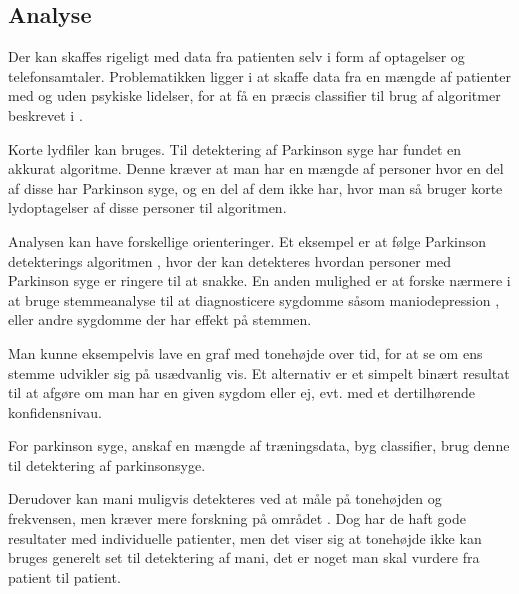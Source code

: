 \subsection{Analyse}
\begin{description}[style=nextline]
	\item[Har vi data nok?]
	Der kan skaffes rigeligt med data fra patienten selv i form af optagelser og telefonsamtaler. Problematikken ligger i at skaffe data fra en mængde af patienter med og uden psykiske lidelser, for at få en præcis classifier til brug af algoritmer beskrevet i \citep{6168572,6346375}.
	
	\item[Hvilke data skal benyttes?]
	Korte lydfiler kan bruges. Til detektering af Parkinson syge har \citep{6168572} fundet en akkurat algoritme. Denne kræver at man har en mængde af personer hvor en del af disse har Parkinson syge, og en del af dem ikke har, hvor man så bruger korte lydoptagelser af disse personer til algoritmen.
	
	\item[Formål med analysen]
	Analysen kan have forskellige orienteringer. Et eksempel er at følge Parkinson detekterings algoritmen \citep{6168572}, hvor der kan detekteres hvordan personer med Parkinson syge er ringere til at snakke.
	En anden mulighed er at forske nærmere i at bruge stemmeanalyse til at diagnosticere sygdomme såsom maniodepression \citep{6346375}, eller andre sygdomme der har effekt på stemmen.

	\item[Idé til visualisering]
	Man kunne eksempelvis lave en graf med tonehøjde over tid, for at se om ens stemme udvikler sig på usædvanlig vis.
	Et alternativ er et simpelt binært resultat til at afgøre om man har en given sygdom eller ej, evt. med et dertilhørende konfidensnivau.
	\item[Oprids fremgangsmåde]
	For parkinson syge, anskaf en mængde af træningsdata, byg classifier, brug denne til detektering af parkinsonsyge.
	
	Derudover kan mani muligvis detekteres ved at måle på tonehøjden og frekvensen, men kræver mere forskning på området \citep{6346375}.
	Dog har de haft gode resultater med individuelle patienter, men det viser sig at tonehøjde ikke kan bruges generelt set til detektering af mani, det er noget man skal vurdere fra patient til patient.
	
\end{description}
